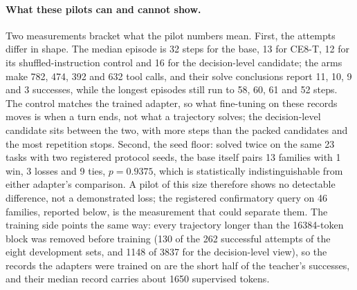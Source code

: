 \paragraph{What these pilots can and cannot show.} Two measurements bracket what the pilot numbers mean.
First, the attempts differ in shape. The median episode is 32 steps for the base, 13 for CE8-T, 12 for its
shuffled-instruction control and 16 for the decision-level candidate; the arms make 782, 474, 392 and 632 tool
calls, and their solve conclusions report 11, 10, 9 and 3 successes, while the longest episodes still run to 58,
60, 61 and 52 steps. The control matches the trained adapter, so what fine-tuning on these records moves
is when a turn ends, not what a trajectory solves; the decision-level candidate sits between the two, with more
steps than the packed candidates and the most repetition stops. Second, the seed floor: solved twice on the same
23 tasks with two registered protocol seeds, the base itself pairs 13 families with 1 win, 3 losses and 9 ties,
$p=0.9375$, which is statistically indistinguishable from either adapter's comparison. A pilot of this
size therefore shows no detectable difference, not a demonstrated loss; the registered confirmatory query on 46
families, reported below, is the measurement that could separate them. The training side points the same way: every trajectory
longer than the 16384-token block was removed before training (130 of the 262 successful attempts of the eight
development sets, and 1148 of 3837 for the decision-level view), so the records the adapters were trained on are
the short half of the teacher's successes, and their median record carries about 1650 supervised tokens.

